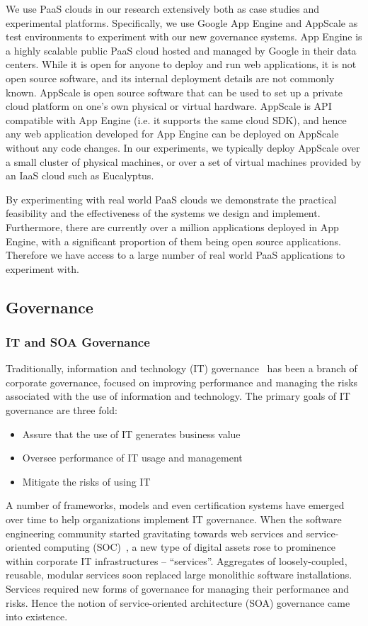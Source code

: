 We use PaaS clouds in our research extensively both as case studies
and experimental platforms. Specifically, we use Google App Engine and AppScale as test environments
to experiment with our new governance systems. App Engine is a highly scalable public PaaS cloud hosted and
managed by Google in their data centers. While it is open for anyone to deploy and run web applications, it is not
open source software, and its internal deployment details are not commonly known. AppScale is open source
software that can be used to set up a private cloud platform on one's own physical or virtual hardware. AppScale
is API compatible with App Engine (i.e. it supports the same cloud SDK), and hence any web application developed
for App Engine can be deployed on AppScale without any code changes. In our experiments, we typically deploy
AppScale over a small cluster of physical machines, or over a set of virtual machines provided by an IaaS cloud
such as Eucalyptus.

By experimenting with real world PaaS clouds we demonstrate the practical feasibility and the effectiveness of 
the systems we design and implement. Furthermore, there are currently over a million applications deployed
in App Engine, with a significant proportion of them being open source applications. Therefore we have access
to a large number of real world PaaS applications to experiment with.

\subsection{Governance}
\subsubsection{IT and SOA Governance}
Traditionally, information and technology (IT) governance~\cite{brown2005framing} has been a branch of 
corporate governance, focused on
improving performance and managing the risks associated with the use of information and technology. The primary
goals of IT governance are three fold:

\begin{itemize}
\item Assure that the use of IT generates business value
\item Oversee performance of IT usage and management
\item Mitigate the risks of using IT
\end{itemize}

A number of frameworks, models and even certification systems have emerged over time to help organizations 
implement IT governance. When the software engineering community started gravitating towards web services and
service-oriented computing (SOC)~\cite{1254461, what-is-soa}, a new type of digital assets rose to prominence within corporate IT 
infrastructures -- ``services''. Aggregates of loosely-coupled, reusable, modular services soon replaced 
large monolithic software
installations. Services required new forms of governance for managing their performance
and risks. Hence the notion of service-oriented architecture (SOA) governance came into existence. 

